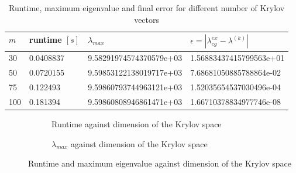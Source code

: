 \documentclass[11pt,a4paper]{article}
\begin{document}
\newpage
\renewcommand{\arraystretch}{2}
\begin{table}[h!]
	\begin{center}
		\begin{tabular}{ p{2cm} p{2cm} p{5cm} p{5cm}}
			\hline
			\hline
			$m$ & runtime $[s]$ & $\lambda_{max}$ & $\epsilon = |\lambda_{cg}^{ex} - \lambda^{(k)}|$ \\
			\hline
			\hline
			30 & 0.0408837  & 9.58291974574370579e+03 & 1.56883437415799563e+01\\
			\hline
			50 & 0.0720155  & 9.59853122138019717e+03 & 7.68681050885788864e-02\\
			\hline
			75 & 0.122493  & 9.59860793744963121e+03 & 1.52035654537030496e-04\\
			\hline
			100 & 0.181394   & 9.59860808946861471e+03  & 1.66710378834977746e-08\\
			\hline
			\hline
		\end{tabular}
		\caption{\label{tab:Lanc}  Runtime, maximum eigenvalue and final error for different number of Krylov vectors}
	\end{center}
\end{table}
\renewcommand{\arraystretch}{1}

\begin{figure}[h!]
	\centering
	\begin{subfigure}[h!]{.49\textwidth}
		\begin{center}
			\resizebox{0.52\width}{!}{}
			\caption{Runtime against dimension of the Krylov space}
			\label{fig::Lanc1}
		\end{center}	
	\end{subfigure}
	\hfill
	\begin{subfigure}[h!]{.49\textwidth}
		\centering
		\resizebox{0.52\width}{!}{}
		\caption{$\lambda_{max}$ against dimension of the Krylov space}
		\label{fig::Lanc2}
	\end{subfigure}
	\caption{Runtime and maximum eigenvalue against dimension of the Krylov space}
	\label{fig::Lanc}
\end{figure}
\end{document}
